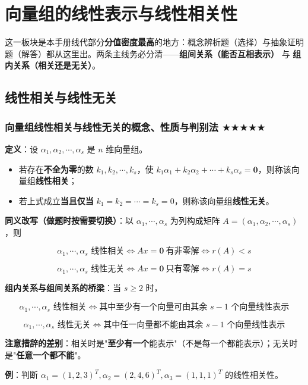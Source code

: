 \documentclass[11pt,openany,UTF8]{ctexbook}
\begin{document}
\section{向量组的线性表示与线性相关性}

这一板块是本手册线代部分\textbf{分值密度最高}的地方：概念辨析题（选择）与抽象证明题（解答）都从这里出。两条主线务必分清——\textbf{组间关系（能否互相表示）} 与 \textbf{组内关系（相关还是无关）}。

\subsection{线性相关与线性无关}

\subsubsection{向量组线性相关与线性无关的概念、性质与判别法 $\bigstar$$\bigstar$$\bigstar$$\bigstar$$\bigstar$}

\textbf{定义}：设 $\alpha_1,\alpha_2,\cdots,\alpha_s$ 是 $n$ 维向量组。

\begin{itemize}
\item 若存在\textbf{不全为零}的数 $k_1,k_2,\cdots,k_s$，使 $k_1\alpha_1+k_2\alpha_2+\cdots+k_s\alpha_s=\mathbf{0}$，则称该向量组\textbf{线性相关}；
\item 若上式成立\textbf{当且仅当} $k_1=k_2=\cdots=k_s=0$，则称该向量组\textbf{线性无关}。
\end{itemize}
\textbf{同义改写（做题时按需要切换）}：以 $\alpha_1,\cdots,\alpha_s$ 为列构成矩阵 $A=(\alpha_1,\alpha_2,\cdots,\alpha_s)$，则

\[\alpha_1,\cdots,\alpha_s \text{ 线性相关}\iff Ax=\mathbf{0}\ \text{有非零解}\iff r(A)<s\]

\[\alpha_1,\cdots,\alpha_s \text{ 线性无关}\iff Ax=\mathbf{0}\ \text{只有零解}\iff r(A)=s\]

\textbf{组内关系与组间关系的桥梁}：当 $s\ge 2$ 时，

\[\alpha_1,\cdots,\alpha_s \text{ 线性相关}\iff \text{其中至少有一个向量可由其余 } s-1 \text{ 个向量线性表示}\]

\[\alpha_1,\cdots,\alpha_s \text{ 线性无关}\iff \text{其中任一向量都不能由其余 } s-1 \text{ 个向量线性表示}\]

\textbf{注意措辞的差别}：相关时是"\textbf{至少有一个}能表示"（不是每一个都能表示）；无关时是"\textbf{任意一个都不能}"。

\textbf{例}：判断 $\alpha_1=(1,2,3)^T,\alpha_2=(2,4,6)^T,\alpha_3=(1,1,1)^T$ 的线性相关性。
\end{document}
